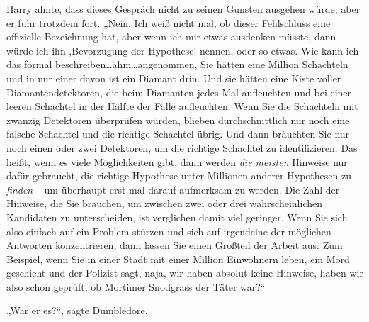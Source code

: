 Harry ahnte, dass dieses Gespräch nicht zu seinen Gunsten ausgehen würde, aber er fuhr trotzdem fort. „Nein. Ich weiß nicht mal, ob dieser Fehlschluss eine offizielle Bezeichnung hat, aber wenn ich mir etwas ausdenken müsste, dann würde ich ihn ‚Bevorzugung der Hypothese‘ nennen, oder so etwas. Wie kann ich das formal beschreiben…ähm…angenommen, Sie hätten eine Million Schachteln und in nur einer davon ist ein Diamant drin. Und sie hätten eine Kiste voller Diamantendetektoren, die beim Diamanten jedes Mal aufleuchten und bei einer leeren Schachtel in der Hälfte der Fälle aufleuchten. Wenn Sie die Schachteln mit zwanzig Detektoren überprüfen würden, blieben durchschnittlich nur noch eine falsche Schachtel und die richtige Schachtel übrig. Und dann bräuchten Sie nur noch einen oder zwei Detektoren, um die richtige Schachtel zu identifizieren. Das heißt, wenn es viele Möglichkeiten gibt, dann werden \emph{die meisten} Hinweise nur dafür gebraucht, die richtige Hypothese unter Millionen anderer Hypothesen zu \emph{finden} – um überhaupt erst mal darauf aufmerksam zu werden. Die Zahl der Hinweise, die Sie brauchen, um zwischen zwei oder drei wahrscheinlichen Kandidaten zu unterscheiden, ist verglichen damit viel geringer. Wenn Sie sich also einfach auf ein Problem stürzen und sich auf irgendeine der möglichen Antworten konzentrieren, dann lassen Sie einen Großteil der Arbeit aus. Zum Beispiel, wenn Sie in einer Stadt mit einer Million Einwohnern leben, ein Mord geschieht und der Polizist sagt, naja, wir haben absolut keine Hinweise, haben wir also schon geprüft, ob Mortimer Snodgrass der Täter war?“

„War er es?“, sagte Dumbledore.

